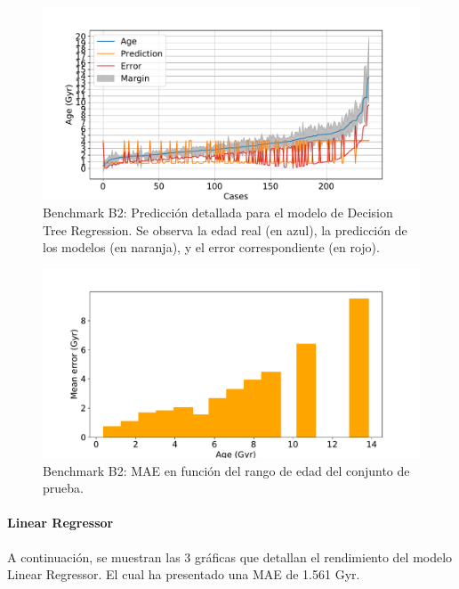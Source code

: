 \begin{figure}[H]
\begin{center}
 \includegraphics[width=0.8\linewidth]{Figuras/Experimentos/B_B2_dtr_2.pdf}
\end{center}
\caption{Benchmark B2: Predicción detallada para el modelo de Decision Tree Regression. Se observa la edad real (en azul), la predicción de los modelos (en naranja), y el error correspondiente (en rojo).}
 \label{fig:benchB2_details_dtr_2}
\end{figure}

\begin{figure}[H]
\begin{center}
 \includegraphics[width=0.8\linewidth]{Figuras/Experimentos/B_B2_dtr_3.pdf}
\end{center}
\caption{Benchmark B2: MAE en función del rango de edad del conjunto de prueba.}
 \label{fig:benchB2_details_dtr_3}
\end{figure}

\paragraph{Linear Regressor} 
A continuación, se muestran las 3 gráficas que detallan el rendimiento del modelo Linear Regressor. El cual ha presentado una MAE de 1.561 Gyr.

